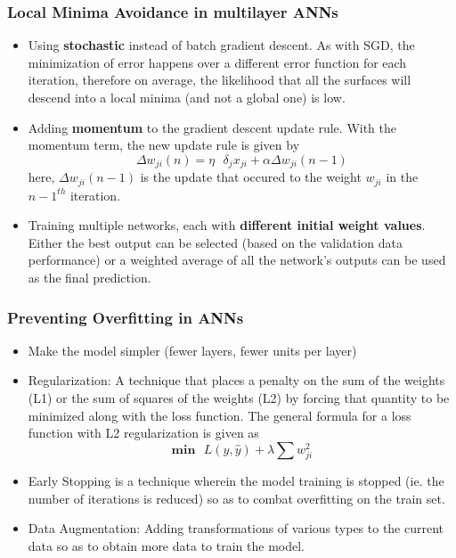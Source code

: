 \documentclass{article}
\theoremstyle{plain}
\theoremstyle{definition}
\begin{document}
\subsubsection{Local Minima Avoidance in multilayer ANNs}
\begin{itemize}
    \item Using \textbf{stochastic} instead of batch gradient descent. As with SGD, the minimization of error happens over a different error function for each iteration, therefore on average, the likelihood that all the surfaces will descend into a local minima (and not a global one) is low. 
    
    \item Adding \textbf{momentum} to the gradient descent update rule. With the momentum term, the new update rule is given by
    \begin{equation*}
        \Delta w_{ji} (n) = \eta\text{ }\delta_j x_{ji} + \alpha \Delta w_{ji}(n-1)
    \end{equation*}
    here, $\Delta w_{ji}(n-1)$ is the update that occured to the weight $w_{ji}$ in the $n-1^{th}$ iteration. 
    
    \item Training multiple networks, each with \textbf{different initial weight values}. Either the best output can be selected (based on the validation data performance) or a weighted average of all the network's outputs can be used as the final prediction. 
\end{itemize}

\subsubsection{Preventing Overfitting in ANNs}
\begin{itemize}
    \item Make the model simpler (fewer layers, fewer units per layer)
    
    \item Regularization: A technique that places a penalty on the sum of the weights (L1) or the sum of squares of the weights (L2) by forcing that quantity to be minimized along with the loss function. The general formula for a loss function with L2 regularization is given as
    \begin{equation*}
        \mathbf{min}\text{ }L(y, \hat{y}) + \lambda \sum w_{ji}^2
    \end{equation*}
    
    \item Early Stopping is a technique wherein the model training is stopped (ie. the number of iterations is reduced) so as to combat overfitting on the train set. 
    
    \item Data Augmentation: Adding transformations of various types to the current data so as to obtain more data to train the model. 
\end{itemize}
\end{document}
